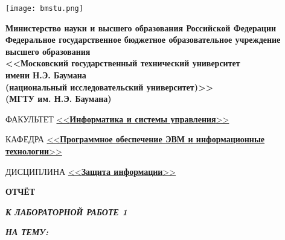 \begin{titlepage}
	\noindent\begin{minipage}{0.05\textwidth}
		\texttt{[image: bmstu.png]}
	\end{minipage}
	\hfill
	\begin{minipage}{0.85\textwidth}\raggedleft
		\begin{center}
			\fontsize{12pt}{0.3\baselineskip}\selectfont \textbf{Министерство науки и высшего образования Российской Федерации \\ Федеральное государственное бюджетное образовательное учреждение \\ высшего образования \\ <<Московский государственный технический университет \\ имени Н.Э. Баумана \\ (национальный исследовательский университет)>> \\ (МГТУ им. Н.Э. Баумана)}
		\end{center}
	\end{minipage}
	
	\begin{center}
		\fontsize{12pt}{0.1\baselineskip}\selectfont
		\noindent\makebox[\linewidth]{\rule{\textwidth}{4pt}} \makebox[\linewidth]{\rule{\textwidth}{1pt}}
	\end{center}
	
	\begin{flushleft}
		\fontsize{12pt}{0.8\baselineskip}\selectfont 
		
		ФАКУЛЬТЕТ \uline{<<\textbf{Информатика и системы управления}>> \hfill}
		
		КАФЕДРА \uline{<<\textbf{Программное обеспечение ЭВМ и информационные технологии}>> \hfill}
		
		ДИСЦИПЛИНА \uline{<<\textbf{Защита информации}>> \hfill}
	\end{flushleft}
	
	\vfill
	
	\begin{center}
		\fontsize{18pt}{\baselineskip}\selectfont
		
		\textbf{ОТЧЁТ}
		
		\textbf{\textit{К ЛАБОРАТОРНОЙ РАБОТЕ 1}}
		
		\textbf{\textit{НА ТЕМУ:}}
	\end{center}
	
	\begin{center}
		\fontsize{18pt}{0.6cm}\selectfont 
		

\end{center}
\end{titlepage}
